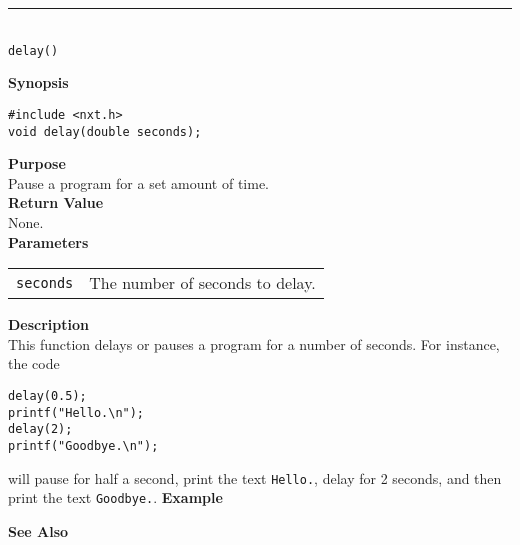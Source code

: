 \noindent
\vspace{5pt}
\rule{4.5in}{0.015in}\\
\noindent
{\LARGE \texttt{delay()}}\\
{}

\noindent
{\bf Synopsis}
\vspace{-8pt}
\begin{verbatim}
#include <nxt.h>
void delay(double seconds);
\end{verbatim}

\noindent
{\bf Purpose}\\
Pause a program for a set amount of time.\\

\noindent
{\bf Return Value}\\
None.\\

\noindent
{\bf Parameters}
\vspace{-0.1in}
\begin{description}
\item               
\begin{tabular}{p{15 mm}p{145 mm}}
\texttt{seconds} & The number of seconds to delay. \\
\end{tabular}
\end{description}

\noindent
{\bf Description}\\
This function delays or pauses a program for a number of seconds. For instance, 
the code 
\begin{verbatim}
delay(0.5);
printf("Hello.\n");
delay(2);
printf("Goodbye.\n");
\end{verbatim}
will pause for half a second, print the text \texttt{Hello.}, delay for 2 seconds,
and then print the text \texttt{Goodbye.}. 
\noindent
{\bf Example}\\
\noindent

\noindent
{\bf See Also}\\

